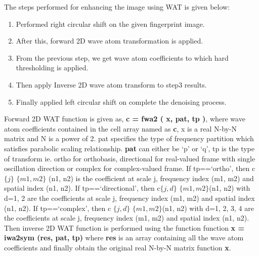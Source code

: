 The steps performed for enhancing the image using WAT is given below:
\begin{enumerate}
\item Performed right circular shift on the given fingerprint image.
\item After this, forward 2D wave atom transformation is applied.
\item From the previous step, we get wave atom coefficients to which hard thresholding is applied.
\item Then apply Inverse 2D wave atom transform to step3 results.
\item Finally applied left circular shift on complete the denoising process.
\end{enumerate}
Forward 2D WAT function is given as, \textbf{c = fwa2 ( x, pat, tp )}, where wave atom coefficients contained in the cell array named as \textbf{c}, x is a real N-by-N matrix and N is a power of 2. pat specifies the type of frequency partition which satisfies parabolic scaling relationship. \textbf{pat} can either be `p' or `q', tp is the type of transform ie. ortho for orthobasis, directional for real-valued frame with single oscillation direction or complex for complex-valued frame. If tp==`ortho', then c $\lbrace j \rbrace$ $\lbrace m1, m2 \rbrace $ (n1, n2) is the coefficient at scale j, frequency index (m1, m2) and spatial index (n1, n2). If tp==`directional', then c$\lbrace j, d \rbrace$ $\lbrace m1, m2 \rbrace $(n1, n2) with d=1, 2 are the coefficients at scale j, frequency index (m1, m2) and spatial index (n1, n2). If tp==`complex', then c $\lbrace j,d \rbrace$ $ \lbrace m1, m2 \rbrace $(n1, n2) with d=1, 2, 3, 4 are the coefficients at scale j, frequency index (m1, m2) and spatial index (n1, n2). Then inverse 2D WAT function is performed using the function function \textbf{x = iwa2sym (res, pat, tp)} where \textbf{res} is an array containing all the wave atom coefficients and finally obtain the original real N-by-N matrix function \textbf{x}.


